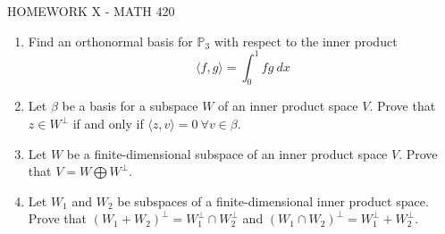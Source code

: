 \documentclass{article}
\begin{document}
\centerline{HOMEWORK X - MATH 420}

\begin{enumerate}

\item Find an orthonormal basis for $\mathbb{P}_3$ with respect to the inner product $$\langle f,g\rangle=\int_{0}^{1} f g\ dx$$

\item Let $\beta$ be a basis for a subspace $W$ of an inner product space $V$. Prove that $z\in W^\perp$ if and only if $\langle z,v\rangle=0\ \forall v\in \beta$.

\item Let $W$ be a finite-dimensional subspace of an inner product space $V$. Prove that
$V=W\bigoplus W^\perp$. 


\item Let $W_1$ and $W_2$ be subspaces of a finite-dimensional inner product space. Prove that
$(W_1+W_2)^\perp=W_1^\perp\cap W_2^\perp$ and $(W_1\cap W_2)^\perp=W_1^\perp+W_2^\perp$.






     \end{enumerate}
     
\end{document}
